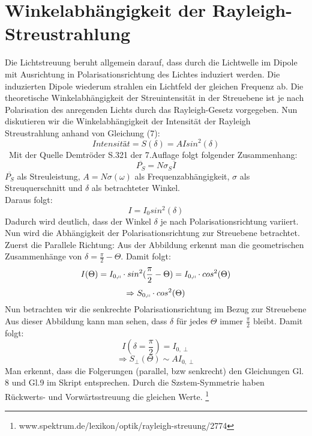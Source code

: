 \section{Winkelabhängigkeit der Rayleigh-Streustrahlung}
Die Lichtstreuung beruht allgemein darauf, dass durch die Lichtwelle im Dipole mit Ausrichtung in Polarisationsrichtung des Lichtes induziert werden. Die induzierten Dipole wiederum strahlen ein Lichtfeld der gleichen Frequenz ab. Die theoretische Winkelabhängigkeit der Streuintensität in der Streuebene ist je nach Polarisation des anregenden Lichts durch das Rayleigh-Gesetz vorgegeben. 
Nun diskutieren wir die Winkelabhängigkeit der Intensität der Rayleigh Streustrahlung anhand von Gleichung (7): 
\begin{equation}
Intensität = S(\delta)=AIsin^2(\delta)
\end{equation}\
Mit der Quelle Demtröder S.321 der 7.Auflage folgt folgender Zusammenhang:
\begin{equation}
\overline{P_S}=N\sigma_S \overline{I}
\end{equation}
$\overline{P_S}$ als Streuleistung, $A=N\sigma(\omega)$ als Frequenzabhängigkeit, $\sigma$ als Streuquerschnitt und $\delta$ als betrachteter Winkel.\\
Daraus folgt:
\begin{equation}
I=I_0 sin^2(\delta)
\end{equation}
Dadurch wird deutlich, dass der Winkel $\delta$ je nach Polarisationsrichtung variiert. \\
Nun wird die Abhängigkeit der Polarisationsrichtung zur Streuebene betrachtet. 
Zuerst die Parallele Richtung:
Aus der Abbildung erkennt man die geometrischen Zusammenhänge von $\delta=\frac{\pi}{2}-\Theta$. Damit folgt:
\begin{equation}
I(\Theta)=I_{0,\shortparallel}\cdot sin^2 (\frac{\pi}{2}-\Theta)=I_{0,\shortparallel}\cdot cos^2(\Theta)
\end{equation}
\begin{equation}
\Rightarrow S_{0,\shortparallel}\cdot cos^2(\Theta)
\end{equation}
Nun betrachten wir die senkrechte Polarisationsrichtung im Bezug zur Streuebene
Aus dieser Abbildung kann man sehen, dass $\delta$ für jedes $\Theta$ immer $\frac{\pi}{2}$ bleibt. Damit folgt:
\begin{equation}
I(\delta=\frac{\pi}{2}) = I_{0,\perp}
\end{equation}
\begin{equation}
\Rightarrow S_\perp (\Theta) \sim AI_{0,\perp}
\end{equation}
Man erkennt, dass die Folgerungen (parallel, bzw senkrecht) den Gleichungen Gl. 8 und Gl.9 im Skript entsprechen. 
Durch die Szstem-Symmetrie haben Rückwerts- und Vorwärtsstreuung die gleichen Werte.
\footnote{www.spektrum.de/lexikon/optik/rayleigh-streuung/2774}


